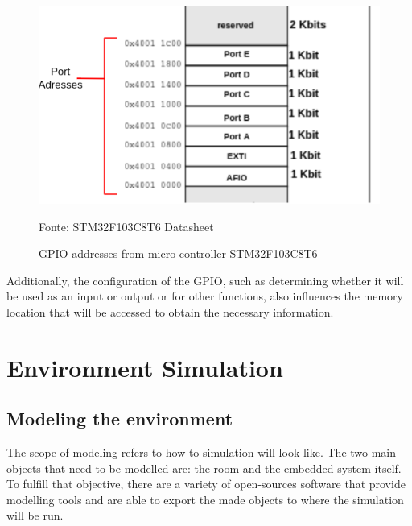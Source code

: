 \documentclass[../monografia.tex]{subfiles}
\begin{document}
\begin{figure}[h]
\centering
    \caption{GPIO addresses from micro-controller STM32F103C8T6}
    \centering %
    \includegraphics[width=14cm]{GPIO_addresses.png}
    \par
    Fonte: STM32F103C8T6 Datasheet \cite{STM32F103C8T6_Datasheet_23}
    \label{fig: GPIO addresses from micro-controller STM32F103C8T6}
\end{figure}

Additionally, the configuration of the GPIO, such as determining whether it will be used as an input or output or for other functions, also influences the memory location that will be accessed to obtain the necessary information.




\chapter{Environment Simulation}
\section{Modeling the environment}
The scope of modeling refers to how to simulation will look like. The two main objects that need to be modelled are: the room and the embedded system itself. To fulfill that objective, there are a variety of open-sources  software that provide modelling tools and are able to export the made objects to where the simulation will be run. 
\end{document}
